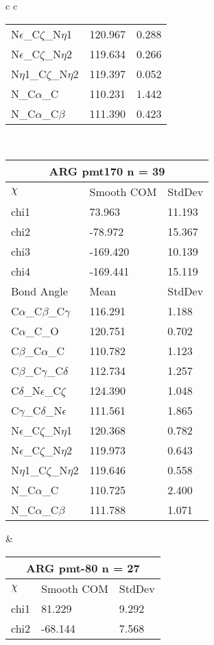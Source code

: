 \begin{longtable}{ c c }
\begin{tabular}{ l l l }
  N$\epsilon$\_C$\zeta$\_N$\eta$1 & 120.967 & 0.288\\
  N$\epsilon$\_C$\zeta$\_N$\eta$2 & 119.634 & 0.266\\
  N$\eta$1\_C$\zeta$\_N$\eta$2 & 119.397 & 0.052\\
  N\_C$\alpha$\_C & 110.231 & 1.442\\
  N\_C$\alpha$\_C$\beta$ & 111.390 & 0.423\\
  \bottomrule
  \end{tabular}
  \\
  \begin{tabular}{ l l l }
  \toprule
  \multicolumn{3}{c}{ARG \textbf{pmt170} n = 39} \\ \toprule
  $\chi$       & Smooth COM & StdDev \\ \midrule
  chi1 & 73.963 & 11.193 \\ 
  chi2 & -78.972 & 15.367 \\ 
  chi3 & -169.420 & 10.139 \\ 
  chi4 & -169.441 & 15.119 \\ \midrule
  Bond Angle   & Mean     & StdDev \\ \midrule
  C$\alpha$\_C$\beta$\_C$\gamma$ & 116.291 & 1.188\\
  C$\alpha$\_C\_O & 120.751 & 0.702\\
  C$\beta$\_C$\alpha$\_C & 110.782 & 1.123\\
  C$\beta$\_C$\gamma$\_C$\delta$ & 112.734 & 1.257\\
  C$\delta$\_N$\epsilon$\_C$\zeta$ & 124.390 & 1.048\\
  C$\gamma$\_C$\delta$\_N$\epsilon$ & 111.561 & 1.865\\
  N$\epsilon$\_C$\zeta$\_N$\eta$1 & 120.368 & 0.782\\
  N$\epsilon$\_C$\zeta$\_N$\eta$2 & 119.973 & 0.643\\
  N$\eta$1\_C$\zeta$\_N$\eta$2 & 119.646 & 0.558\\
  N\_C$\alpha$\_C & 110.725 & 2.400\\
  N\_C$\alpha$\_C$\beta$ & 111.788 & 1.071\\
  \bottomrule
  \end{tabular}
  &
  \begin{tabular}{ l l l }
  \toprule
  \multicolumn{3}{c}{ARG \textbf{pmt-80} n = 27} \\ \toprule
  $\chi$       & Smooth COM & StdDev \\ \midrule
  chi1 & 81.229 & 9.292 \\ 
  chi2 & -68.144 & 7.568 \\ 

\end{tabular}
\end{longtable}
